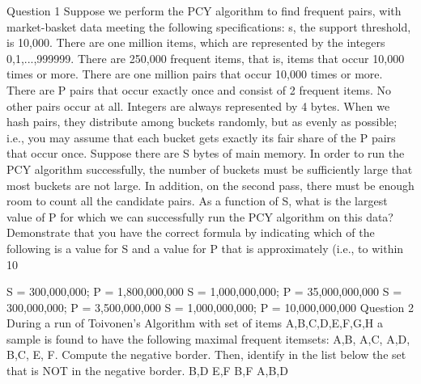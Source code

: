 Question 1
Suppose we perform the PCY algorithm to find frequent pairs, with market-basket data meeting the following specifications:
s, the support threshold, is 10,000.
There are one million items, which are represented by the integers 0,1,...,999999.
There are 250,000 frequent items, that is, items that occur 10,000 times or more.
There are one million pairs that occur 10,000 times or more.
There are P pairs that occur exactly once and consist of 2 frequent items.
No other pairs occur at all.
Integers are always represented by 4 bytes.
When we hash pairs, they distribute among buckets randomly, but as evenly as possible; i.e., you may assume that each bucket gets exactly its fair share of the P pairs that occur once.
Suppose there are S bytes of main memory. In order to run the PCY algorithm successfully, the number of buckets must be sufficiently large that most buckets are not large. In addition, on the second pass, there must be enough room to count all the candidate pairs. As a function of S, what is the largest value of P for which we can successfully run the PCY algorithm on this data? Demonstrate that you have the correct formula by indicating which of the following is a value for S and a value for P that is approximately (i.e., to within 10%

S = 300,000,000; P = 1,800,000,000
S = 1,000,000,000; P = 35,000,000,000
S = 300,000,000; P = 3,500,000,000
S = 1,000,000,000; P = 10,000,000,000
Question 2
During a run of Toivonen's Algorithm with set of items {A,B,C,D,E,F,G,H} a sample is found to have the following maximal frequent itemsets: {A,B}, {A,C}, {A,D}, {B,C}, {E}, {F}. Compute the negative border. Then, identify in the list below the set that is NOT in the negative border.
{B,D}
{E,F}
{B,F}
{A,B,D}
